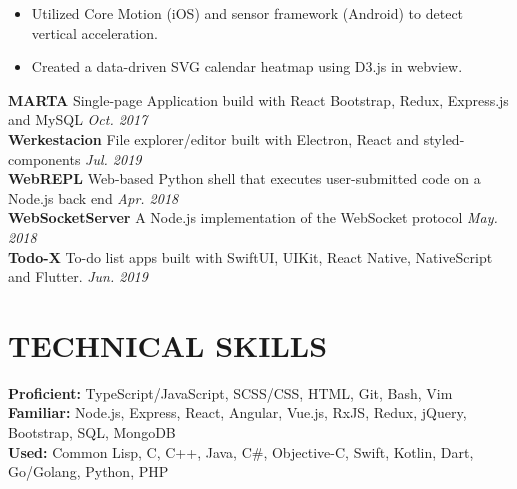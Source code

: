 \documentclass[11pt]{article}
\begin{document}
\begin{itemize}[leftmargin=15pt, noitemsep, topsep=0pt]
\item Utilized Core Motion (iOS) and sensor framework (Android) to detect vertical acceleration.
\item Created a data-driven SVG calendar heatmap using D3.js in webview.
\end{itemize}
\vspace{0.5em}
%
\textbf{MARTA} \enspace Single-page Application build with React Bootstrap, Redux, Express.js and MySQL \hfill\textit{Oct. 2017}\\
\textbf{Werkestacion} \enspace File explorer/editor built with Electron, React and styled-components \hfill \textit{Jul. 2019}\\
\textbf{WebREPL}  \enspace Web-based Python shell that executes user-submitted code on a Node.js back end \hfill\textit{Apr. 2018}\\
\textbf{WebSocketServer}  \enspace A Node.js implementation of the WebSocket protocol \hfill\textit{May. 2018}\\
\textbf{Todo-X} \enspace To-do list apps built with SwiftUI, UIKit, React Native, NativeScript and Flutter. \hfill\textit{Jun. 2019}
%
\section*{TECHNICAL SKILLS}
\textbf{Proficient:} TypeScript/JavaScript, SCSS/CSS, HTML, Git, Bash, Vim\\
\textbf{Familiar:} Node.js, Express, React, Angular, Vue.js, RxJS, Redux, jQuery, Bootstrap, SQL, MongoDB\\
\textbf{Used:} Common Lisp, C, C++, Java, C\#, Objective-C, Swift, Kotlin, Dart, Go/Golang, Python, PHP
\end{document}
